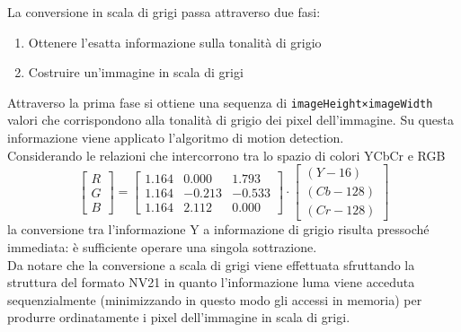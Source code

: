 La conversione in scala di grigi passa attraverso due fasi:
\begin{enumerate}
  \item Ottenere l'esatta informazione sulla tonalità di grigio
  \item Costruire un'immagine in scala di grigi
\end{enumerate}

Attraverso la prima fase si ottiene una sequenza di \texttt{imageHeight×imageWidth} valori che corrispondono alla tonalità di grigio dei pixel dell'immagine. Su questa informazione viene applicato l'algoritmo di motion detection.\\
Considerando le relazioni che intercorrono tra lo spazio di colori YCbCr e RGB
\[
\left[\begin{array}{c}R\\G\\B\end{array}\right] = \left[
\begin{array}{ccc}1.164&0.000&1.793\\1.164&-0.213&-0.533\\1.164&2.112&0.000\end{array}
\right]\cdot \left[\begin{array}{c}(Y-16)\\(Cb-128)\\(Cr-128)\end{array}\right]
\]
la conversione tra l'informazione Y a informazione di grigio risulta pressoché immediata: è sufficiente operare una singola sottrazione.\\
Da notare che la conversione a scala di grigi viene effettuata sfruttando la struttura del formato NV21 in quanto l'informazione luma viene acceduta sequenzialmente (minimizzando in questo modo gli accessi in memoria) per produrre ordinatamente i pixel dell'immagine in scala di grigi.\\

